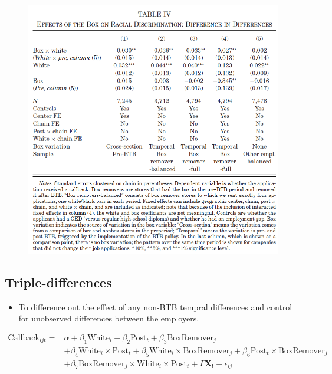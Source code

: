 \documentclass[../root]{subfiles}
\begin{document}
    \begin{figure}[ht]
        \centering
        \includegraphics[scale = .8]{0925tanji/T4}
    \end{figure}

    \subsection{Triple-differences}

    \begin{itemize}
      \item To difference out the effect of any non-BTB tempral differences and control for unobserved differences between the employers.
    \end{itemize}

    \begin{align*}
      \text{Callback}_{ijt} =& \alpha + \beta_1 \text{White}_i + \beta_2 \text{Post}_t + \beta_3 \text{BoxRemover}_j \\
      & + \beta_4 \text{White}_i \times \text{Post}_t + \beta_5 \text{White}_i \times \text{BoxRemover}_j + \beta_6 \text{Post}_t \times \text{BoxRemover}_j \\
      & + \beta_7 \text{BoxRemover}_j \times \text{White}_i \times \text{Post}_t + \Gamma \mathbf{X_i} + \epsilon_{ij}
    \end{align*}
\end{document}
